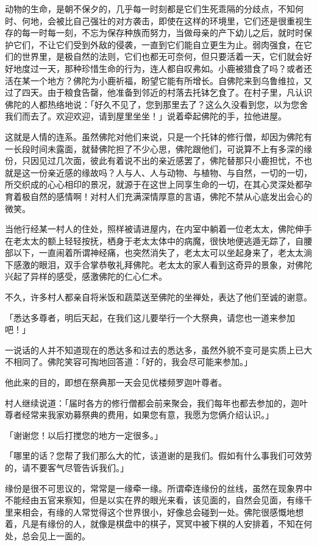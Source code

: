 \documentclass[12pt,twoside,openany]{book}
\begin{document}
动物的生命，是朝不保夕的，几乎每一时刻都是它们生死乖隔的分歧点，不知何时、何地，会被比自己强壮的对方袭击，即使在这样的环境里，它们还是很重视生存的每一时每一刻，不忘为保存种族而努力，当做母亲的产下幼儿之后，就时时保护它们，不让它们受到外敌的侵袭，一直到它们能自立更生为止。弱肉强食，在它们的世界里，是极自然的法则，它们也都无可奈何，但只要活着一天，它们就会好好地度过一天，那种珍惜生命的行为，连人都自叹弗如。小鹿被猎食了吗？或者还活在某一个地方？佛陀为小鹿祈福，盼望它能有所增长。自佛陀来到乌鲁维拉，又过了四天。由于粮食告罄，他准备到邻近的村落去托钵乞食了。在村子里，凡认识佛陀的人都热络地说：「好久不见了，您到那里去了？这么久没看到您，以为您舍我们而去了。欢迎欢迎，请到屋里坐坐！」说着牵起佛陀的手，拉他进屋。

这就是人情的连系。虽然佛陀对他们来说，只是一个托钵的修行僧，却因为佛陀有一长段时间未露面，就替佛陀担了不少心思，佛陀跟他们，可说算不上有多深的缘份，只因见过几次面，彼此有着说不出的亲近感罢了，佛陀替那只小鹿担忧，不也就是这一份亲近感的缘故吗？人与人、人与动物、与植物、与自然，一切的一切，所交织成的心心相印的景况，就源于在这世上同享生命的一切，在其心灵深处都孕育着极自然的感情啊！对村人们充满深情厚意的言语，佛陀不禁从心底发出会心的微笑。

当他行经某一村人的住处，照样被请进屋内，在内室中躺着一位老太太，佛陀伸手在老太太的额上轻轻按抚，栖身于老太太体中的病魔，很快地便逃遁无踪了，自腰部以下，一直闹着所谓神经痛，也突然消失了，老太太可以坐起身来了，老太太淌下感激的眼泪，双手合掌恭敬礼拜佛陀。老太太的家人看到这奇异的景象，对佛陀兴起了异样的感受，感激佛陀的仁心仁术。

不久，许多村人都亲自将米饭和蔬菜送至佛陀的坐禅处，表达了他们至诚的谢意。

「悉达多尊者，明后天起，在我们这儿要举行一个大祭典，请您也一道来参加吧！」

一说话的人并不知道现在的悉达多和过去的悉达多，虽然外貌不变可是实质上已大不相同了。佛陀笑容可掏地回答道：「好的，我会尽可能来参加。」

他此来的目的，即想在祭典那一天会见优楼频罗迦叶尊者。

村人继续说道：「届时各方的修行僧都会前来聚会，我们每年也都去参加的，迦叶尊者经常来我家劝募祭典的费用，如果您有意，我愿为您俩介绍认识。」

「谢谢您！以后打搅您的地方一定很多。」

「哪里的话？您帮了我们那么大的忙，该道谢的是我们。假如有什么事我们可效劳的，请不要客气尽管告诉我们。」

缘份是很不可思议的，常常是一缘牵一缘。所谓牵连缘份的丝线，虽然在现象界中不能经由五官来察知，但是以实在界的眼光来看，该见面的，自然会见面，有缘千里来相会，有缘的人常觉得这个世界很小，好像总会碰到一处。佛陀很感慨地想着，凡是有缘份的人，就像是棋盘中的棋子，冥冥中被下棋的人安排着，不知在何处，总会见上一面的。
\end{document}
